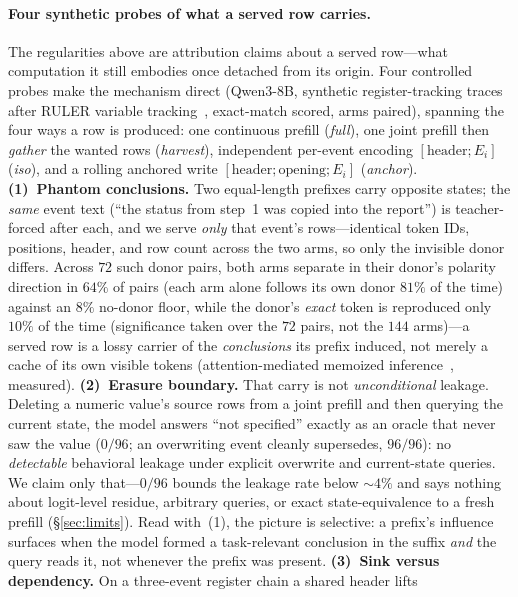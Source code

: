 \documentclass{article} %
\begin{document}
\paragraph{Four synthetic probes of what a served row carries.} The regularities above are
attribution claims about a served row---what computation it still embodies once detached
from its origin. Four controlled probes make the mechanism direct (Qwen3-8B, synthetic
register-tracking traces after RULER variable tracking~\citep{ruler}, exact-match scored,
arms paired), spanning the four ways a row is produced: one continuous prefill
(\emph{full}), one joint prefill then \emph{gather} the wanted rows (\emph{harvest}),
independent per-event encoding $[\text{header};E_i]$ (\emph{iso}), and a rolling anchored
write $[\text{header};\text{opening};E_i]$ (\emph{anchor}). \textbf{(1)~Phantom conclusions.} Two equal-length prefixes carry opposite states; the
\emph{same} event text (``the status from step~1 was copied into the report'') is
teacher-forced after each, and we serve \emph{only} that event's rows---identical token
IDs, positions, header, and row count across the two arms, so only the invisible donor
differs. Across $72$ such donor pairs, both arms separate in their donor's polarity
direction in $64\%$ of pairs (each arm alone follows its own donor $81\%$ of the time)
against an $8\%$ no-donor floor, while the donor's \emph{exact} token is reproduced only
$10\%$ of the time (significance taken over the $72$ pairs, not the $144$ arms)---a served
row is a lossy carrier of the \emph{conclusions} its prefix induced, not merely a cache of
its own visible tokens (attention-mediated memoized inference~\citep{kvnotes}, measured).
\textbf{(2)~Erasure boundary.} That carry is not \emph{unconditional} leakage. Deleting a
numeric value's source rows from a joint prefill and then querying the current state, the
model answers ``not specified'' exactly as an oracle that never saw the value ($0/96$; an
overwriting event cleanly supersedes, $96/96$): no \emph{detectable} behavioral leakage
under explicit overwrite and current-state queries. We claim only that---$0/96$ bounds the
leakage rate below ${\sim}4\%$ and says nothing about logit-level residue, arbitrary
queries, or exact state-equivalence to a fresh prefill (\S\ref{sec:limits}). Read with~(1),
the picture is selective: a prefix's influence surfaces when the model formed a
task-relevant conclusion in the suffix \emph{and} the query reads it, not whenever the
prefix was present. \textbf{(3)~Sink versus dependency.} On a three-event register chain a shared header lifts
\end{document}
